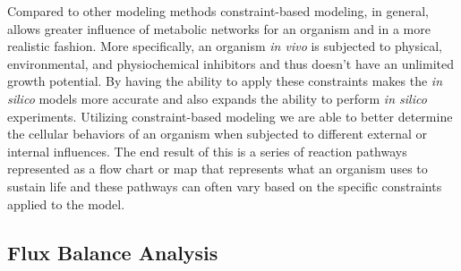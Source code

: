%
%
%
%
%
\indent Compared to other modeling methods constraint-based modeling, in general, allows greater influence of metabolic networks for an organism and in a more realistic fashion.  More specifically, an organism \textit{in vivo} is subjected to physical, environmental, and physiochemical inhibitors and thus doesn't have an unlimited growth potential.  By having the ability to apply these constraints makes the \textit{in silico} models more accurate and also expands the ability to perform \textit{in silico} experiments. Utilizing constraint-based modeling we are able to better determine the cellular behaviors of an organism when subjected to different external or internal influences. The end result of this is a series of reaction pathways represented as a flow chart or map that represents what an organism uses to sustain life and these pathways can often vary based on the specific constraints applied to the model. 
%
%
%
\subsection{Flux Balance Analysis}

